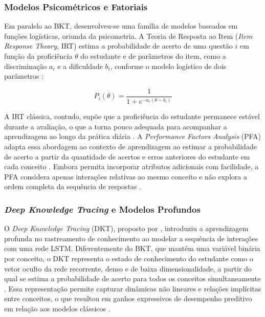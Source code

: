 \subsubsection{Modelos Psicométricos e Fatoriais}
\label{subsubsec:modelos-psicometricos}

Em paralelo ao BKT, desenvolveu-se uma família de modelos baseados em funções logísticas, oriunda da psicometria. A Teoria de Resposta ao Item (\textit{Item Response Theory}, IRT) estima a probabilidade de acerto de uma questão $i$ em função da proficiência $\theta$ do estudante e de parâmetros do item, como a discriminação $a_i$ e a dificuldade $b_i$, conforme o modelo logístico de dois parâmetros \cite{embretson_item_2013, cui_rebalancing_2025}:

\begin{equation}
\label{eq:irt-2pl}
P_i(\theta) = \frac{1}{1 + e^{-a_i(\theta - b_i)}}
\end{equation}

A IRT clássica, contudo, supõe que a proficiência do estudante permanece estável durante a avaliação, o que a torna pouco adequada para acompanhar a aprendizagem ao longo da prática diária \cite{shen_assessing_2022}. A \textit{Performance Factors Analysis} (PFA) adapta essa abordagem ao contexto de aprendizagem ao estimar a probabilidade de acerto a partir da quantidade de acertos e erros anteriores do estudante em cada conceito \cite{pavlik_performance_2009}. Embora permita incorporar atributos adicionais com facilidade, a PFA considera apenas interações relativas ao mesmo conceito e não explora a ordem completa da sequência de respostas \cite{nagatani_augmenting_2019}.

\subsubsection{\textit{Deep Knowledge Tracing} e Modelos Profundos}
\label{subsubsec:dkt}

O \textit{Deep Knowledge Tracing} (DKT), proposto por , introduziu a aprendizagem profunda no rastreamento de conhecimento ao modelar a sequência de interações com uma rede LSTM. Diferentemente do BKT, que mantém uma variável binária por conceito, o DKT representa o estado de conhecimento do estudante como o vetor oculto da rede recorrente, denso e de baixa dimensionalidade, a partir do qual se estima a probabilidade de acerto para todos os conceitos simultaneamente \cite{nagatani_augmenting_2019}. Essa representação permite capturar dinâmicas não lineares e relações implícitas entre conceitos, o que resultou em ganhos expressivos de desempenho preditivo em relação aos modelos clássicos \cite{gao_transformer-based_2025}.

